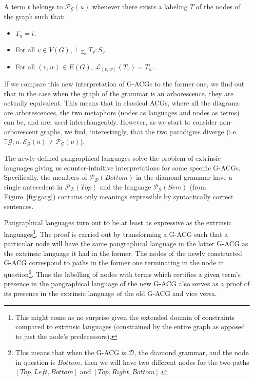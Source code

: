 \documentclass{llncs}
\begin{document}
A term $t$ belongs to $\mathcal{P}_{\mathcal{G}}(u)$ whenever there
exists a labeling $T$ of the nodes of the graph such that:

\begin{itemize}
  \item $T_u = t$.
  \item For all $v \in V(G)$, $\vdash_{\Sigma_v} T_v : S_v$.
  \item For all $(v,w) \in E(G)$, $\mathcal{L}_{(v,w)}(T_v) = T_w$.
\end{itemize}

If we compare this new interpretation of G-ACGs to the former one, we find out
that in the case when the graph of the grammar is an arborescence, they are
actually equivalent. This means that in classical ACGs, where all the diagrams
are arborescences, the two metaphors (nodes as languages and nodes as terms)
can be, and are, used interchangeably. However, as we start to consider
non-arborescent graphs, we find, interestingly, that the two paradigms diverge
(i.e. $\exists \mathcal{G}, u.\ \mathcal{E}_{\mathcal{G}}(u) \neq
\mathcal{P}_{\mathcal{G}}(u)$).

The newly defined pangraphical languages solve the problem of extrinsic
languages giving us counter-intuitive interpretations for some specific
G-ACGs. Specifically, the members of $\mathcal{P}_{\mathcal{D}}(Bottom)$ in
the diamond grammar have a single antecedent in
$\mathcal{P}_{\mathcal{D}}(Top)$ and the language
$\mathcal{P}_{\mathcal{G}}(Sem)$ (from Figure~\ref{fig:gacg}) contains only
meanings expressible by syntactically correct sentences.

Pangraphical languages turn out to be at least as expressive as the extrinsic
languages\footnote{This might come as no surprise given the extended domain of
  constraints compared to extrinsic languages (constrained by the entire graph
  as opposed to just the node's predecessors).}. The proof is carried out by
transforming a G-ACG such that a particular node will have the same
pangraphical language in the latter G-ACG as the extrinsic language it had in
the former. The nodes of the newly constructed G-ACG correspond to paths in
the former one terminating in the node in question\footnote{This means that
  when the G-ACG is $\mathcal{D}$, the diamond grammar, and the node in
  question is $Bottom$, then we will have two different nodes for the two
  paths $[Top, Left, Bottom]$ and $[Top, Right, Bottom]$.}. Thus the labelling
of nodes with terms which certifies a given term's presence in the
pangraphical language of the new G-ACG also serves as a proof of its presence
in the extrinsic language of the old G-ACG and vice versa.
\end{document}
